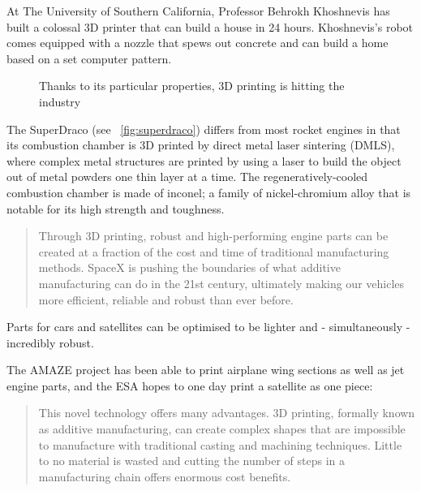 At The University of Southern California, Professor Behrokh Khoshnevis has built a colossal 3D printer that can build a house in 24 hours. Khoshnevis's robot comes equipped with a nozzle that spews out concrete and can build a home based on a set computer pattern.



\begin{figure}[h]
\centering
    \hfil
    \caption{Thanks to its particular properties, 3D printing is hitting the industry}
    \label{fig:3D_printed_objects}
\end{figure}

The SuperDraco (see \figurename~\ref{fig:superdraco}) differs from most rocket engines in that its combustion chamber is 3D printed by direct metal laser sintering (DMLS), where complex metal structures are printed by using a laser to build the object out of metal powders one thin layer at a time. The regeneratively-cooled combustion chamber is made of inconel; a family of nickel-chromium alloy that is notable for its high strength and toughness.

\begin{quotation}
    Through 3D printing, robust and high-performing engine parts can be created at a fraction of the cost and time of traditional manufacturing methods. SpaceX is pushing the boundaries of what additive manufacturing can do in the 21st century, ultimately making our vehicles more efficient, reliable and robust than ever before.
\end{quotation}


Parts for cars and satellites can be optimised to be lighter and - simultaneously - incredibly robust.

The AMAZE project has been able to print airplane wing sections as well as jet engine parts, and the ESA hopes to one day print a satellite as one piece:
\begin{quotation}
    This novel technology offers many advantages. 3D printing, formally known as additive manufacturing, can create complex shapes that are impossible to manufacture with traditional casting and machining techniques. Little to no material is wasted and cutting the number of steps in a manufacturing chain offers enormous cost benefits.
\end{quotation}




